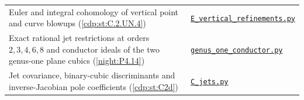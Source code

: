 {\begin{longtable}{@{}>{\raggedright\arraybackslash}p{}>{\raggedright\arraybackslash}p{}@{}}
Euler and integral cohomology of vertical point and curve blowups (\cref{cdp:st:C.2.UN.4}) & \href{https://raw.githubusercontent.com/KokunoYumeto/s6-complex-structure-workbench/\SsixRepositoryCommit/pro_returns/S6_03_CDP_checkpoint_13_20261116T0136Z/S6_03_CDP/code/E_vertical_refinements.py}{\nolinkurl{E_vertical_refinements.py}} \\[3pt]
Exact rational jet restrictions at orders $2,3,4,6,8$ and conductor ideals of the two genus-one plane cubics (\cref{night:P4.14}) & \href{https://raw.githubusercontent.com/KokunoYumeto/s6-complex-structure-workbench/\SsixRepositoryCommit/pro_returns/S6_06_BLIND_checkpoint_15_20261117T1457Z/S6_06_BLIND/code/part4/genus_one_conductor.py}{\nolinkurl{genus_one_conductor.py}} \\[3pt]
Jet covariance, binary-cubic discriminants and inverse-Jacobian pole coefficients (\cref{cdp:st:C2d}) & \href{https://raw.githubusercontent.com/KokunoYumeto/s6-complex-structure-workbench/\SsixRepositoryCommit/pro_returns/S6_03_CDP_checkpoint_13_20261116T0136Z/S6_03_CDP/code/C_jets.py}{\nolinkurl{C_jets.py}} \\[3pt]
\end{longtable}}

